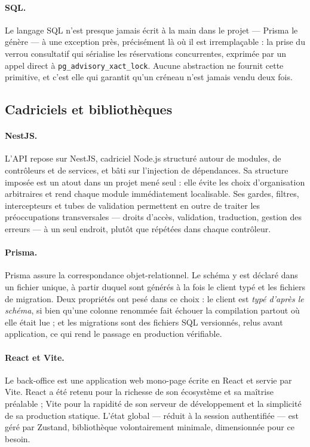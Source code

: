 \paragraph{SQL.} Le langage SQL n'est presque jamais écrit à la main dans le
projet --- Prisma le génère --- à une exception près, précisément là où il est
irremplaçable : la prise du verrou consultatif qui sérialise les réservations
concurrentes, exprimée par un appel direct à \texttt{pg\_advisory\_xact\_lock}.
Aucune abstraction ne fournit cette primitive, et c'est elle qui garantit
qu'un créneau n'est jamais vendu deux fois.

\subsection{Cadriciels et bibliothèques}

\paragraph{NestJS.} L'API repose sur NestJS, cadriciel Node.js structuré autour
de modules, de contrôleurs et de services, et bâti sur l'injection de
dépendances. Sa structure imposée est un atout dans un projet mené seul : elle
évite les choix d'organisation arbitraires et rend chaque module immédiatement
localisable. Ses gardes, filtres, intercepteurs et tubes de validation
permettent en outre de traiter les préoccupations transversales --- droits
d'accès, validation, traduction, gestion des erreurs --- à un seul endroit,
plutôt que répétées dans chaque contrôleur.

\paragraph{Prisma.} Prisma assure la correspondance objet-relationnel. Le
schéma y est déclaré dans un fichier unique, à partir duquel sont générés à la
fois le client typé et les fichiers de migration. Deux propriétés ont pesé dans
ce choix : le client est \emph{typé d'après le schéma}, si bien qu'une colonne
renommée fait échouer la compilation partout où elle était lue ; et les
migrations sont des fichiers SQL versionnés, relus avant application, ce qui
rend le passage en production vérifiable.

\paragraph{React et Vite.} Le back-office est une application web mono-page
écrite en React et servie par Vite. React a été retenu pour la richesse de son
écosystème et sa maîtrise préalable ; Vite pour la rapidité de son serveur de
développement et la simplicité de sa production statique. L'état global ---
réduit à la session authentifiée --- est géré par Zustand, bibliothèque
volontairement minimale, dimensionnée pour ce besoin.


